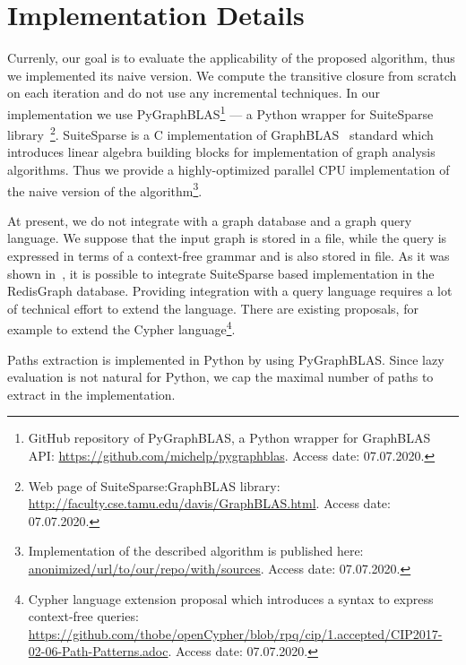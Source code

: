 \section{Implementation Details}

Currenly, our goal is to evaluate the applicability of the proposed algorithm, thus we implemented its naive version.
We compute the transitive closure from scratch on each iteration and do not use any incremental techniques.
In our implementation we use PyGraphBLAS\footnote{GitHub repository of PyGraphBLAS, a Python wrapper for GraphBLAS API: \url{https://github.com/michelp/pygraphblas}. Access date: 07.07.2020.} --- a Python wrapper for SuiteSparse library~\cite{10.1145/3322125}\footnote{Web page of SuiteSparse:GraphBLAS library: \url{http://faculty.cse.tamu.edu/davis/GraphBLAS.html}. Access date: 07.07.2020.}.
SuiteSparse is a C implementation of GraphBLAS~\cite{7761646} standard which introduces linear algebra building blocks for implementation of graph analysis algorithms.
Thus we provide a highly-optimized parallel CPU implementation of the naive version of the algorithm\footnote{Implementation of the described algorithm is published here: \url{anonimized/url/to/our/repo/with/sources}. Access date: 07.07.2020.}.%

At present, we do not integrate with a graph database and a graph query language.
We suppose that the input graph is stored in a file, while the query is expressed in terms of a context-free grammar and is also stored in file.
As it was shown in~\cite{10.1145/3398682.3399163}, it is possible to integrate SuiteSparse based implementation in the RedisGraph database.
Providing integration with a query language requires a lot of technical effort to extend the language.
There are existing proposals, for example to extend the Cypher language\footnote{Cypher language extension proposal which introduces a syntax to express context-free queries: \url{https://github.com/thobe/openCypher/blob/rpq/cip/1.accepted/CIP2017-02-06-Path-Patterns.adoc}. Access date: 07.07.2020.}.

Paths extraction is implemented in Python by using PyGraphBLAS.
Since lazy evaluation is not natural for Python, we cap the maximal number of paths to extract in the implementation.
